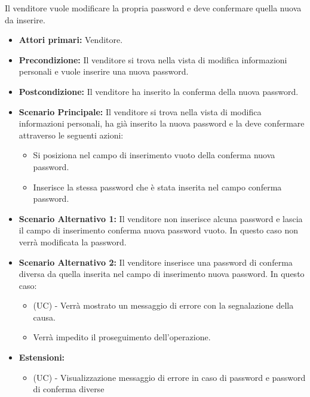 Il venditore vuole modificare la propria password e deve confermare quella nuova da inserire.
\begin{itemize}
    \item \textbf{Attori primari:} Venditore.
    \item \textbf{Precondizione:} Il venditore si trova nella vista di modifica informazioni personali e vuole inserire una nuova password.
    \item \textbf{Postcondizione:} Il venditore ha inserito la conferma della nuova password.
    \item \textbf{Scenario Principale:} Il venditore si trova nella vista di modifica informazioni personali, ha già inserito la nuova password e la deve confermare attraverso le seguenti azioni:
        \begin{itemize}
            \item Si posiziona nel campo di inserimento vuoto della conferma nuova password.
            \item Inserisce la stessa password che è stata inserita nel campo conferma password.
        \end{itemize}
    \item \textbf{Scenario Alternativo 1:} Il venditore non inserisce alcuna password e lascia il campo di inserimento conferma nuova password vuoto. In questo caso non verrà modificata la password.
    \item \textbf{Scenario Alternativo 2:} Il venditore inserisce una password di conferma diversa da quella inserita nel campo di inserimento nuova password. In questo caso:
    \begin{itemize}
        \item (UC) - Verrà mostrato un messaggio di errore con la segnalazione della causa.
        \item Verrà impedito il proseguimento dell'operazione.
    \end{itemize}
    \item \textbf{Estensioni:}
    \begin{itemize}
        \item (UC) - Visualizzazione messaggio di errore in caso di password e password di conferma diverse
    \end{itemize}
\end{itemize}

